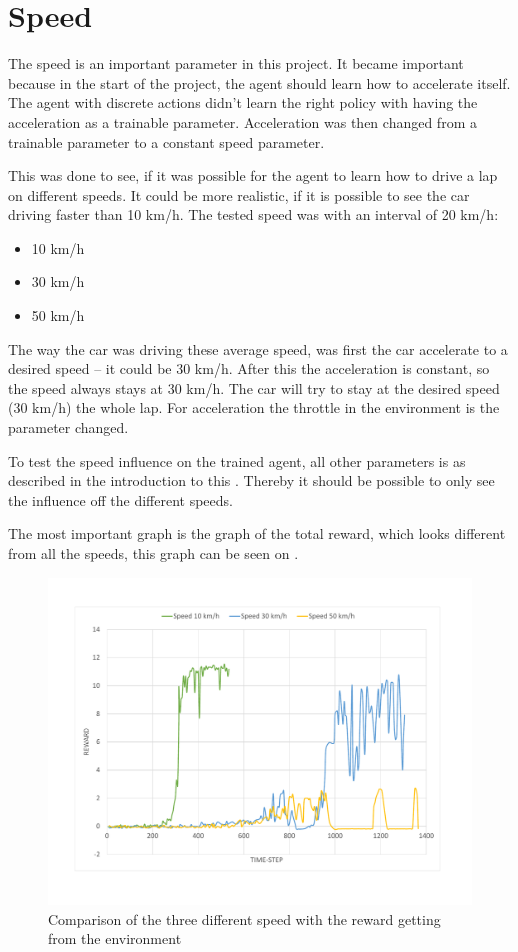 \section{Speed}\label{sectionAcceleration}
The speed is an important parameter in this project. It became important because in the start of the project, the agent should learn how to accelerate itself. The agent with discrete actions didn't learn the right policy with having the acceleration as a trainable parameter. Acceleration was then changed from a trainable parameter to a constant speed parameter. 

This was done to see, if it was possible for the agent to learn how to drive a lap on different speeds. It could be more realistic, if it is possible to see the car driving faster than 10 km/h. The tested speed was with an interval of 20 km/h: 
\begin{itemize}
	\item 10 km/h
	\item 30 km/h
	\item 50 km/h
\end{itemize} 

The way the car was driving these average speed, was first the car accelerate to a desired speed – it could be 30 km/h. After this the acceleration is constant, so the speed always stays at 30 km/h. The car will try to stay at the desired speed (30 km/h) the whole lap. For acceleration the throttle in the environment is the parameter changed. 

To test the speed influence on the trained agent, all other parameters is as described in the introduction to this . Thereby it should be possible to only see the influence off the different speeds. 

The most important graph is the graph of the total reward, which looks different from all the speeds, this graph can be seen on . 


\begin{figure}[H]
	\centering
	\includegraphics[width=1\textwidth]{Figures/Result/change_of_acceleration_reward_graph.pdf}
	\caption{Comparison of the three different speed with the reward getting from the environment}
	\label{fig:change_of_acceleration_reward_graph}
\end{figure} 


